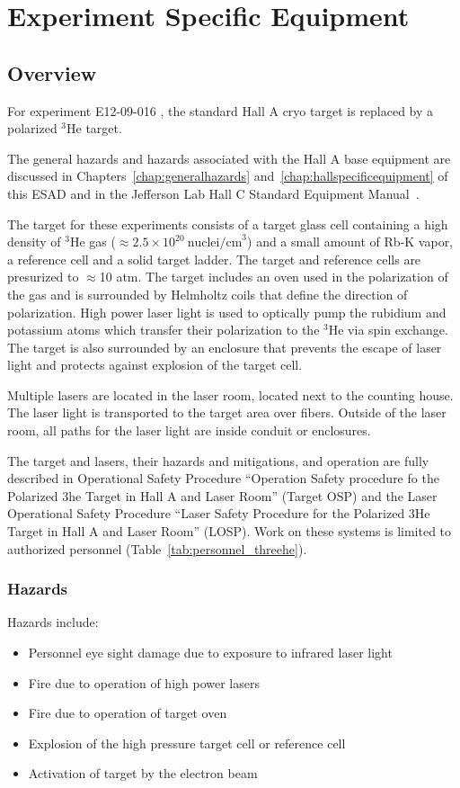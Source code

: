 \chapter{Experiment Specific Equipment}
\label{chap:expspecific}



\section{Overview}
For experiment E12-09-016 , the standard Hall A cryo
target is replaced by a polarized ${}^3$He target.

The general hazards and hazards associated with the Hall A base
equipment are discussed in Chapters~\ref{chap:generalhazards}
and~\ref{chap:hallspecificequipment} of this ESAD and in the Jefferson
Lab Hall C Standard Equipment Manual~\cite{HallAosp}.

The target for these experiments consists of a target glass cell containing a
high density of ${}^3$He gas
($\approx 2.5 \times 10^{20}~\textrm{nuclei/cm}^3$)
and a small amount of Rb-K vapor, a reference cell and a solid target
ladder.  The target and reference cells are presurized to $\approx$10 atm.
The target includes an oven used in the polarization of the
gas and is surrounded by Helmholtz coils that define the direction of
polarization.  High power laser light is used to optically pump the rubidium
and potassium atoms which transfer their polarization to the ${}^3$He
via spin exchange.
The target is also surrounded by an enclosure that prevents the escape of
laser light and protects against explosion of the target cell.

Multiple lasers are located in the laser room, located next to the counting
house.  The laser light is transported to the target area over
fibers.  Outside of the laser room, all paths for the laser light are
inside conduit or enclosures.

The target and lasers, their hazards and mitigations, and operation
are fully described in Operational Safety Procedure ``Operation Safety procedure fo the Polarized
3he Target in Hall A and Laser Room'' (Target OSP) and the Laser
Operational Safety Procedure ``Laser Safety Procedure for the
Polarized 3He Target in Hall A and Laser Room'' (LOSP).  Work on these
systems is limited to authorized personnel (Table~\ref{tab:personnel_threehe}).

\subsection{Hazards}
Hazards include:
\begin{itemize}
\item Personnel eye sight damage due to exposure to infrared laser
  light
\item Fire due to operation of high power lasers
\item Fire due to operation of target oven
\item Explosion of the high pressure target cell or reference cell
\item Activation of target by the electron beam
\end{itemize}

